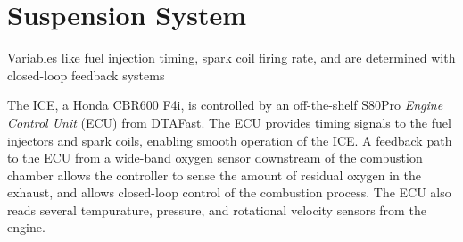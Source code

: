 \documentclass[english]{report}
\begin{document}
\section{Suspension System}

Variables like fuel injection timing, spark coil firing rate, and  are determined with closed-loop
feedback systems 

The ICE, a Honda CBR600 F4i, is controlled by an off-the-shelf S80Pro \emph{Engine Control Unit} 
(ECU) from DTAFast\cite{s60pro}. The ECU provides
timing signals to the fuel injectors and spark coils, enabling smooth operation of the ICE. 
A feedback path to the ECU from a wide-band oxygen sensor downstream of the combustion chamber 
allows the controller to sense the amount of residual oxygen in the exhaust, and allows closed-loop 
control of the combustion process. The ECU also reads several tempurature, pressure, and rotational 
velocity sensors from the engine.
\end{document}
